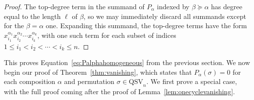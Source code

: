 \documentclass[12pt]{amsart}
\theoremstyle{definition}
\theoremstyle{remark}
\numberwithin{equation}{section}
\newcommand{\QSV}{\mathrm{QSV}}
\begin{document}
\begin{proof}
The top-degree term in the summand of $P_{\alpha}$ indexed by $\beta \succeq \alpha$ has degree equal to the length $\ell$ of $\beta$, so we may immediately discard all summands except for the $\beta = \alpha$ one.  Expanding this summand, the top-degree terms have the form $x_{i_1}^{\alpha_1} x_{i_2}^{\alpha_2}\cdots  x_{i_k}^{\alpha_k}$, with one such term for each subset of indices $1\le i_{1} < i_{2} < \cdots < i_{k} \le n$.
\end{proof}

This proves Equation~\eqref{eq:Palphahomogeneous} from the previous section.  We now begin our proof of Theorem~\ref{thm:vanishing}, which states that $P_{\alpha}(\sigma) = 0$ for each composition $\alpha$ and permutation $\sigma \in \QSV_{n}$.  We first prove a special case, with the full proof coming after the proof of Lemma~\ref{lem:onecyclevanishing}.
\end{document}
